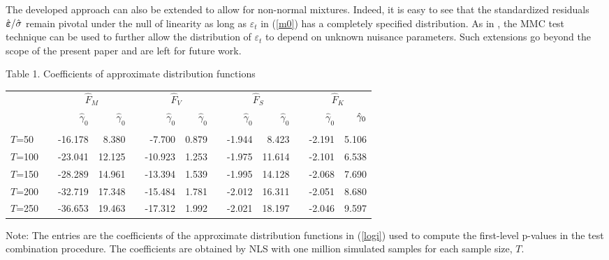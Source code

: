 \documentclass[11pt]{article}
\begin{document}
The developed approach can also be extended to allow for non-normal
mixtures. Indeed, it is easy to see that the standardized residuals $\hat{%
\boldsymbol{\varepsilon }}/\hat{\sigma}$ remain pivotal under the null of
linearity as long as $\varepsilon_t$ in (\ref{m0}) has a completely
specified distribution. As in \citet{Beaulieu-Dufour-Khalaf:2007}, the MMC
test technique can be used to further allow the distribution of $%
\varepsilon_t$ to depend on unknown nuisance parameters. Such extensions go
beyond the scope of the present paper and are left for future work.

{\newpage }




{\renewcommand{\baselinestretch}{1} }

\begin{table}[p]
\begin{center}
Table 1. Coefficients of approximate distribution functions \medskip
\par
\begin{tabular}{lcrrcrrcrrcrr}
\hline\hline
&  & \multicolumn{2}{c}{$\hat{F}_M$} &  & \multicolumn{2}{c}{$\hat{F}_V$} & 
& \multicolumn{2}{c}{$\hat{F}_S$} &  & \multicolumn{2}{c}{$\hat{F}_K$} \\ 
\cline{3-4}\cline{6-7}\cline{9-10}\cline{12-13}
&  & $\hat{\gamma}_0$ & $\hat{\gamma}_0$ &  & $\hat{\gamma}_0$ & $\hat{\gamma%
}_0$ &  & $\hat{\gamma}_0$ & $\hat{\gamma}_0$ &  & $\hat{\gamma}_0$ & $\hat{%
\gamma}_0$ \\ \hline
&  &  &  &  &  &  &  &  &  &  &  &  \\[-2.0ex] 
$T$=50 &  & -16.178 & 8.380 &  & -7.700 & 0.879 &  & -1.944 & 8.423 &  & 
-2.191 & 5.106 \\ 
$T$=100 &  & -23.041 & 12.125 &  & -10.923 & 1.253 &  & -1.975 & 11.614 &  & 
-2.101 & 6.538 \\ 
$T$=150 &  & -28.289 & 14.961 &  & -13.394 & 1.539 &  & -1.995 & 14.128 &  & 
-2.068 & 7.690 \\ 
$T$=200 &  & -32.719 & 17.348 &  & -15.484 & 1.781 &  & -2.012 & 16.311 &  & 
-2.051 & 8.680 \\ 
$T$=250 &  & -36.653 & 19.463 &  & -17.312 & 1.992 &  & -2.021 & 18.197 &  & 
-2.046 & 9.597 \\ \hline\hline
\end{tabular}%
\end{center}
\par
Note: The entries are the coefficients of the approximate distribution
functions in (\ref{logi}) used to compute the first-level p-values in the
test combination procedure. The coefficients are obtained by NLS with one
million simulated samples for each sample size, $T$.
\end{table}
\end{document}
